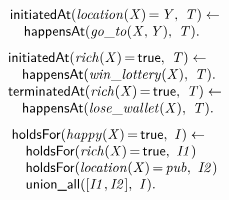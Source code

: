 \documentclass[8pt]{beamer}
\DeclareMathOperator{\val}{=}  %
\def \patsize {}
\def\happensAt{\textsf{\patsize happensAt}}
\def\holdsFor{\textsf{\patsize holdsFor}}
\def\initiatedAt{\textsf{\patsize initiatedAt}}
\def\terminatedAt{\textsf{\patsize terminatedAt}}
\def\unionall{\textsf{\patsize union\_all}}
\def\true{\textsf{\patsize true}}
\newenvironment{mysplit}%
  {\arraycolsep 0pt \begin{array}{l}}%
  {\end{array}}
\begin{document}
\begin{frame}
\begin{minipage}{0.48\linewidth}
        \begin{align*}
            \begin{mysplit}
                \initiatedAt\mathit{(location(X)\val Y,\ T) \leftarrow}\\
                \quad    \happensAt\mathit{(go\_to(X,Y),\ T).}
            \end{mysplit}
        \end{align*}
        \begin{align*}
            \begin{mysplit}
                \initiatedAt\mathit{(rich(X)\val\true,\ T) \leftarrow}\\
                \quad    \happensAt\mathit{(win\_lottery(X),\ T).}\\
                \terminatedAt\mathit{(rich(X)\val\true,\ T) \leftarrow}\\
                \quad    \happensAt\mathit{(lose\_wallet(X),\ T)}.\\
            \end{mysplit}
        \end{align*}
        \begin{align*}
            \begin{mysplit}
                \holdsFor\mathit{(happy(X)\val\true,\ I) \leftarrow}\\
                \quad    \holdsFor\mathit{(rich(X)\val\true,\ I1)}\\
                \quad    \holdsFor\mathit{(location(X)\val pub,\ I2)}\\
                \quad    \unionall\mathit{([I1,I2],\ I)}.
            \end{mysplit}
        \end{align*}
    \end{minipage}

\end{frame}
\end{document}
